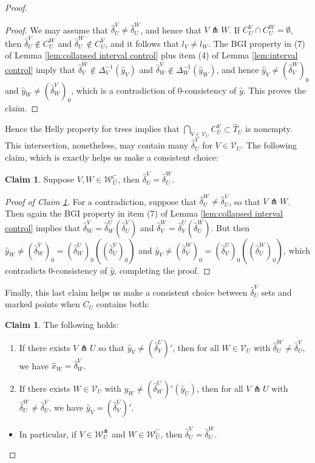 \documentclass{amsart}
\theoremstyle{definition}
\newtheorem{claim}[theorem]{Claim}
\theoremstyle{remark}
\theoremstyle{definition}
\newcommand{\calV}{\mathcal{V}}
\newcommand{\calW}{\mathcal{W}}
\newcommand{\hT}{\widehat{T}}
\newcommand{\hx}{\hat{x}}
\newcommand{\hy}{\hat{y}}
\newcommand{\hd}{\hat{\delta}}
\newcommand{\nest}{\sqsubset}
\begin{document}
\begin{proof}
\begin{proof}
We may assume that $\hd^V_U \neq \hd^W_U$, and hence that $V \pitchfork W$.  If $C^V_U \cap C^W_U = \emptyset$, then $\hd^V_U \notin C^W_U$ and $\hd^W_U \notin C^V_U$, and it follows that $l_V \neq l_W$.  The BGI property in (7) of Lemma \ref{lem:collapsed interval control} plus item (4) of Lemma \ref{lem:interval control} imply that  $\hd^W_V \notin \Delta^{-1}_V(\hy_V)$ and $\hd^V_W \notin \Delta^{-1}_W(\hy_W)$, and hence $\hy_V \neq (\hd^W_V)_0$ and $\hy_W \neq (\hd^V_W)_0$, which is a contradiction of $0$-consistency of $\hy$.  This proves the claim.
\end{proof}

Hence the Helly property for trees implies that $\bigcap_{V \in \calV_U} C^V_U \subset \hT_U$ is nonempty.  This intersection, nonetheless, may contain many $\hd^V_U$ for $V \in \calV_U$.  The following claim, which is exactly \cite[Claim 10.6]{Dur_infcube} helps us make a consistent choice:

\begin{claim}\label{claim:choose two}
Suppose $V, W \in \calW_U^{\nest}$, then $\hd^V_U = \hd^W_U$.
\end{claim}

\begin{proof}[Proof of Claim \ref{claim:choose two}]
For a contradiction, suppose that $\hd^W_U \neq \hd^V_U$, so that $V \pitchfork W$.  Then again the BGI property in item (7) of Lemma \ref{lem:collapsed interval control} implies that $\hd^V_W = \hd^U_W(\hd^V_U)$ and $\hd^W_V = \hd^U_V(\hd^W_U)$.  But then $\hy_W \neq (\hd^V_W)_0 = (\hd^U_W)_0((\hd^V_U)_0)$ and $\hy_V \neq (\hd^W_V)_0 = (\hd^U_V)_0((\hd^W_U)_0)$, which contradicts $0$-consistency of $\hy$, completing the proof.
\end{proof}

Finally, this last claim helps us make a consistent choice between $\hd^V_U$ sets and marked points when $C_U$ contains both:

\begin{claim}\label{claim:good choice}
The following holds:
\begin{enumerate}
\item If there exists $V \pitchfork U$ so that $\hy_V \neq (\hd^U_V)'$, then for all $W \in \calV_U$ with $\hd^W_U \neq \hd^V_U$, we have $\hx_W = \hd^V_W$.
\item If there exists $W \in \calV_U$ with $\hy_W \neq (\hd^U_W)'(\hy_U)$, then for all $V \pitchfork U$ with $\hd^W_U \neq \hd^V_U$, we have $\hy_V = (\hd^U_V)'$.
\end{enumerate}
\begin{itemize}
\item In particular, if $V \in \calW_U^{\pitchfork}$ and $W \in \calW_U^{\nest}$, then $\hd^V_U = \hd^W_U$.
\end{itemize}
\end{claim}


\end{proof}
\end{document}
